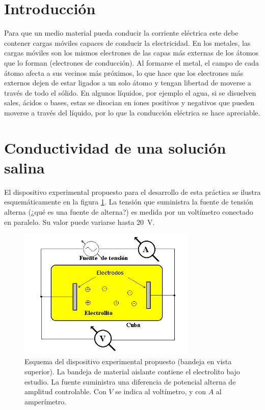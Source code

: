 \documentclass[laboratorio]{guia}
\begin{document}
 
\maketitle


\section{Introducción}
Para que un medio material pueda conducir la corriente eléctrica este debe contener cargas móviles capaces de conducir la electricidad.
En los metales, las cargas móviles son los mismos electrones de las capas más externas de los átomos que lo forman (electrones de conducción).
Al formarse el metal, el campo de cada átomo afecta a sus vecinos más próximos, lo que hace que los electrones más externos dejen de estar ligados a un solo átomo y tengan
libertad de moverse a través de todo el sólido.
En algunos líquidos, por ejemplo el agua, si se disuelven sales, ácidos o bases, estas se disocian en iones positivos y negativos que pueden moverse a través del líquido, por lo que la conducción eléctrica se hace apreciable.


\section{Conductividad de una solución salina}
El dispositivo experimental propuesto para el desarrollo de esta práctica se ilustra esquemáticamente en la figura \ref{fig:1}.
La tensión que suministra la fuente de tensión alterna (¿qué es una fuente de alterna?) es medida por un voltímetro conectado en paralelo.
Su valor puede variarse hasta \SI{20}{\volt}. 
\begin{figure}
    \centering
\includegraphics[width=8.5cm]{LG02b--001.png}
\caption{Esquema del dispositivo experimental propuesto (bandeja en vista superior).
La bandeja de material aislante contiene el electrolito bajo estudio.
La fuente suministra una diferencia de potencial alterna de amplitud controlable.
Con \(V\) se indica al voltímetro, y con \(A\) al amperímetro.}
\label{fig:1}
\end{figure}
\end{document}
